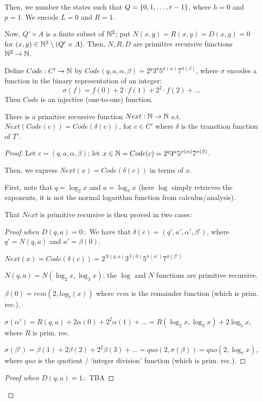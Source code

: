 Then, we number the states such that $ Q = \left\lbrace 0, 1, \dots, r - 1 \right\rbrace $, where $ h = 0 $ and $ p = 1 $. We encode $ L = 0 $ and $ R = 1 $.

Now, $ Q' \times A $ is a finite subset of $ \mathbb{N}^2 $; put $ N(x, y) = R(x, y) = D(x, y) = 0 $ for $ (x, y) \in \mathbb{N}^2 \setminus (Q' \times A) $. Then, $ N, R, D $ are primitive recursive functions $ \mathbb{N}^2 \to \mathbb{N} $.

Define $ Code: C' \to \mathbb{N} $ by $ Code(q, a, \alpha, \beta) = 2^q 3^a 5^{\sigma(\alpha)} 7^{\sigma(\beta)} $, where $ \sigma $ encodes a function in the binary representation of an integer:
\begin{equation*}
\sigma(f) = f(0) + 2 \cdot f(1) + 2^2 \cdot f(2) + \dots
\end{equation*}
Then $ Code $ is an injective (one-to-one) function.

There is a primitive recursive function $ Next: \mathbb{N} \to \mathbb{N} $ s.t. $ Next(Code(c)) = Code(\delta(c)) $, for $ c \in C' $ where $ \delta $ is the transition function of $ T' $.

\begin{proof}

Let $ c = (q, a, \alpha, \beta) $; let $ x \in \mathbb{N} = Code(c) = 2^q 3^a 5^{\sigma(\alpha)} 7^{\sigma(\beta)} $.

Then, we express $ Next(x) = Code(\delta(c)) $ in terms of $ x $.

First, note that $ q = \log_2 x $ and $ a = \log_3 x $ (here $ \log $ simply retrieves the exponents, it is not the normal logarithm function from calculus/analysis).

That $ Next $ is primitive recursive is then proved in two cases:

\begin{proof}[Proof when $ D(q, a) = 0 $:]

We have that $ \delta(c) = (q', a', \alpha', \beta') $, where $ q' = N(q, a) $ and $ a' = \beta(0) $.

$ Next(x) = Code(\delta(c)) = 2^{N(q, a)} 3^{\beta(0)} 5^{\sigma(\alpha')} 7^{\sigma(\beta')} $

$ N(q, a) = N(\log_2 x, \log_3 x) $; the $ \log $ and $ N $ functions are primitive recursive.

$ \beta(0) = rem(2, log_7 (x)) $ where $ rem $ is the remainder function (which is prim. rec.).

$ \sigma(\alpha') = R(q, a) + 2 \alpha(0) + 2^2 \alpha(1) + \dots = R(\log_2 x, \log_3 x) + 2 \log_5 x$, where $ R $ is prim. rec.

$ \sigma(\beta') = \beta(1) + 2 \beta(2) + 2^2 \beta(3) + \dots = quo(2, \sigma(\beta)) = quo(2, \log_7 x) $, where $ quo $ is the quotient / `integer division' function (which is prim. rec.).

\end{proof}

\begin{proof}[Proof when $ D(q, a) = 1 $:]
TBA
\end{proof}

\end{proof}

 

